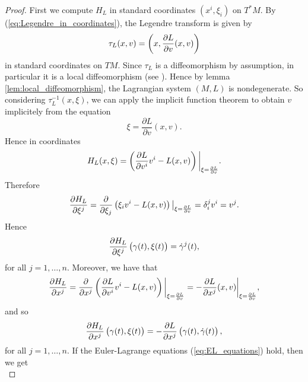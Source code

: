 \begin{proof}
	First we compute $H_L$ in standard coordinates $(x^i,\xi_i)$ on $T^*M$. By (\ref{eq:Legendre_in_coordinates}), the Legendre transform is given by
	\begin{equation}
		\tau_L(x,v) = \del[3]{x,\frac{\partial L}{\partial v}(x,v)}
	\end{equation}
	\noindent in standard coordinates on $TM$. Since $\tau_L$ is a diffeomorphism by assumption, in particular it is a local diffeomorphism (see \cite[80]{lee:smooth_manifolds:2013}). Hence by lemma \ref{lem:local_diffeomorphism}, the Lagrangian system $(M,L)$ is nondegenerate. So considering $\tau^{-1}_L(x,\xi)$, we can apply the implicit function theorem \cite[661]{lee:smooth_manifolds:2013} to obtain $v$ implicitely from the equation
	\begin{equation*}
		\xi = \frac{\partial L}{\partial v}(x,v).
	\end{equation*}
	Hence in coordinates
	\begin{equation*}
		H_L(x,\xi) = \del[3]{\frac{\partial L}{\partial v^i}v^i - L(x,v)}\bigg\vert_{\xi = \frac{\partial L}{\partial v}}.
	\end{equation*}
	Therefore
	\begin{equation*}
		\frac{\partial H_L}{\partial \xi^j} = \frac{\partial}{\partial \xi_j} \del[1]{\xi_i v^i - L(x,v)}\big\vert_{\xi = \frac{\partial L}{\partial v}} = \delta^j_i v^i = v^j.
	\end{equation*}
	Hence
	\begin{equation*}
		\frac{\partial H_L}{\partial \xi^j}\del[1]{\gamma(t),\xi(t)} = \dot{\gamma}^j(t),
	\end{equation*}
	\noindent for all $j = 1,\dots,n$. Moreover, we have that
	\begin{equation*}
		\frac{\partial H_L}{\partial x^j} = \frac{\partial}{\partial x^j}\del[3]{\frac{\partial L}{\partial v^i}v^i - L(x,v)}\bigg\vert_{\xi = \frac{\partial L}{\partial v}} = - \frac{\partial L}{\partial x^j}(x,v)\bigg\vert_{\xi = \frac{\partial L}{\partial v}}, 
	\end{equation*}
	\noindent and so
	\begin{equation*}
		\frac{\partial H_L}{\partial x^j}\del[1]{\gamma(t),\xi(t)} = -\frac{\partial L}{\partial x^j}\del[1]{\gamma(t),\dot{\gamma}(t)},
	\end{equation*}
	\noindent for all $j = 1,\dots,n$. If the Euler-Lagrange equations (\ref{eq:EL_equations}) hold, then we get
	\begin{equation*}

\end{equation*}
\end{proof}
